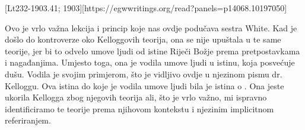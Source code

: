 [Lt232-1903.41; 1903][https://egwwritings.org/read?panels=p14068.10197050]

Ovo je vrlo važna lekcija i princip koje nas ovdje podučava sestra White. Kad je došlo do kontroverze oko Kelloggovih teorija, ona se nije upuštala u te same teorije, jer bi to odvelo umove ljudi od istine Riječi Božje prema pretpostavkama i nagađanjima. Umjesto toga, ona je vodila umove ljudi u istinu, koja posvećuje dušu. Vodila je svojim primjerom, što je vidljivo ovdje u njezinom pismu dr. Kelloggu. Ova istina do koje je vodila umove ljudi bila je istina o . Ona jeste ukorila Kellogga zbog njegovih teorija ali, što je vrlo važno, mi ispravno identificiramo te teorije prema njihovom kontekstu i njezinim implicitnom referiranjem.

